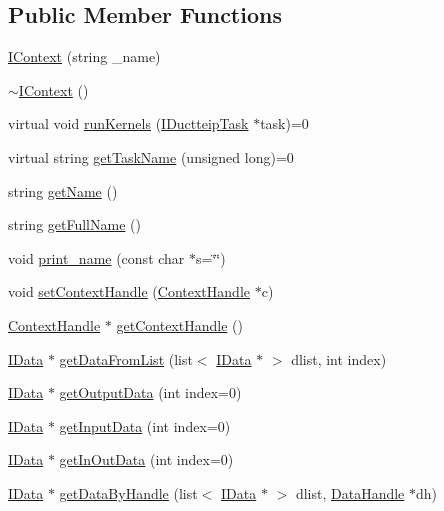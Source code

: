 \subsection*{Public Member Functions}
\begin{DoxyCompactItemize}
\item 
\hyperlink{class_i_context_a46c1edfdc2c9ff7eb8f274f10d98949f}{IContext} (string \_\-name)
\item 
\hyperlink{class_i_context_a7a18ec7377bb445433ab130fa3259a6a}{$\sim$IContext} ()
\item 
virtual void \hyperlink{class_i_context_a7e432ff03dfc96f39e8343b28f17fb74}{runKernels} (\hyperlink{class_i_ductteip_task}{IDuctteipTask} $\ast$task)=0
\item 
virtual string \hyperlink{class_i_context_a8f811884fc095b04c6f6f7df5be5b51d}{getTaskName} (unsigned long)=0
\item 
string \hyperlink{class_i_context_a607d8609c589bfa7937b5a8313c61d04}{getName} ()
\item 
string \hyperlink{class_i_context_a6a8cf9340093917ffb41f8d812c26884}{getFullName} ()
\item 
void \hyperlink{class_i_context_aa590239dd58b3946bfd9fc3d6725eef8}{print\_\-name} (const char $\ast$s=\char`\"{}\char`\"{})
\item 
void \hyperlink{class_i_context_ae51caa1b552828bab3e5317c0efad541}{setContextHandle} (\hyperlink{glb__context_8hpp_a5d74defbecaf11c4dbb0a4ce308e1c34}{ContextHandle} $\ast$c)
\item 
\hyperlink{glb__context_8hpp_a5d74defbecaf11c4dbb0a4ce308e1c34}{ContextHandle} $\ast$ \hyperlink{class_i_context_a63664480f4eede6b3a5ab572dd454160}{getContextHandle} ()
\item 
\hyperlink{class_i_data}{IData} $\ast$ \hyperlink{class_i_context_a63b80af186cfc16907b72e8fdb3a7f11}{getDataFromList} (list$<$ \hyperlink{class_i_data}{IData} $\ast$ $>$ dlist, int index)
\item 
\hyperlink{class_i_data}{IData} $\ast$ \hyperlink{class_i_context_adc30ba64c308b29d60494a0d3ce26852}{getOutputData} (int index=0)
\item 
\hyperlink{class_i_data}{IData} $\ast$ \hyperlink{class_i_context_a9e625b1922446c14cf63f712521788b4}{getInputData} (int index=0)
\item 
\hyperlink{class_i_data}{IData} $\ast$ \hyperlink{class_i_context_ab62e24ee67cb0f7355a0671afd0cbe10}{getInOutData} (int index=0)
\item 
\hyperlink{class_i_data}{IData} $\ast$ \hyperlink{class_i_context_a9e05e14cdde2f0b5a0ed3349815cb974}{getDataByHandle} (list$<$ \hyperlink{class_i_data}{IData} $\ast$ $>$ dlist, \hyperlink{struct_data_handle}{DataHandle} $\ast$dh)

\end{DoxyCompactItemize}

